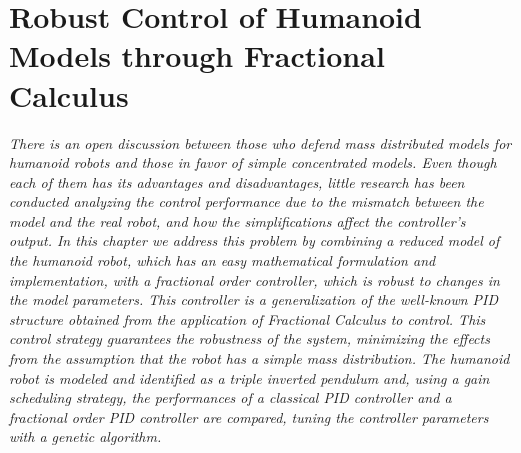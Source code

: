 \chapter{Robust Control of Humanoid Models through Fractional Calculus}\label{frac_chapter}
\textit{There is an open discussion between those who defend mass distributed models for humanoid robots and those in favor of simple concentrated models. Even though each of them has its advantages and disadvantages, little research has been conducted analyzing the control performance due to the mismatch between the model and the real robot, and how the simplifications affect the controller’s output. In this chapter we address this problem by combining a reduced model of the humanoid robot, which has an easy mathematical formulation and implementation, with a fractional order controller, which is robust to changes in the model parameters. This controller is a generalization of the well-known PID structure obtained from the application of Fractional Calculus to control. This control strategy guarantees the robustness of the system, minimizing the effects from the assumption that the robot has a simple mass distribution. The humanoid robot is modeled and identified as a triple inverted pendulum and, using a gain scheduling strategy, the performances of a classical PID controller and a fractional order PID controller are compared, tuning the controller parameters with a genetic algorithm.}
\newpage
%
%
%
%
%
%



